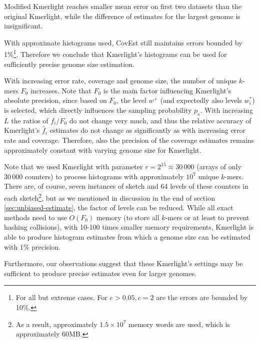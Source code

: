Modified Kmerlight reaches smaller mean error on first two datasets than the original Kmerlight,
while the difference of estimates for the largest genome is insignificant.

\medskip

With approximate histograms used, CovEst still maintains errors bounded by 1\%\footnote{For all but
extreme cases. For $e > 0.05, c = 2$ are the errors are bounded by 10\%.}. Therefore we conclude
that Kmerlight's histograms can be used for sufficiently precise genome size estimation. 

With increasing error rate, coverage and genome size, the number of unique $k$-mers $F_0$ increases.
Note that $F_0$ is the main factor influencing Kmerlight's absolute precision, since based on $F_0$,
the level $w^+$ (and expectedly also levels $w_i^*$) is selected, which directly influences the
sampling probability $p_s$. With increasing $L$ the ratios of $f_i/F_0$ do not change very much,
and thus the relative accuracy of Kmerlight's $\hat f_i$ estimates do not change as significantly
as with increasing error rate and coverage. Therefore, also the precision of the coverage estimates
remains approximately constant with varying genome size for Kmerlight.

Note that we used Kmerlight with parameter $r=2^{15} \approx 30\,000$ (arrays of only $30\,000$
counters) to process histograms with approximately $10^7$ unique $k$-mers.
There are, of course, seven instances of sketch and 64 levels of these counters in each 
sketch\footnote{As a result, approximately $1.5 \times 10^7$ memory words are used, which is approximately
60MB.}, but as we mentioned in discussion in the end of section \ref{sec:unbiased-estimate}, the
factor of levels can be reduced. While all exact methods need to use $O(F_0)$ memory 
(to store all $k$-mers or at least to prevent hashing collisions), with 10-100 times smaller 
memory requirements, Kmerlight is able to produce histogram estimates from which a genome 
size can be estimated with $1\%$ precision. 

Furthermore, our observations suggest that these Kmerlight's settings may be sufficient
to produce precise estimates even for larger genomes.


